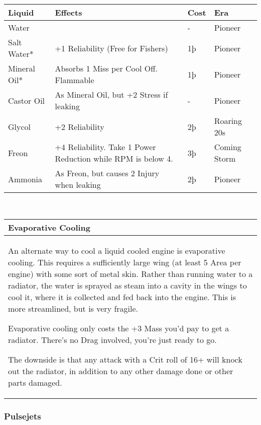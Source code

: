 \documentclass{article}
\begin{document}
\begin{tabular}{|l|l|l|l|}
    \hline
    Liquid       & Effects                                                      & Cost & Era         \\\hline
    Water        &                                                              & -    & Pioneer     \\\hline
    Salt Water*  & +1 Reliability (Free for Fishers)                            & 1þ   & Pioneer     \\\hline
    Mineral Oil* & Absorbs 1 Miss per Cool Off. Flammable                       & 1þ   & Pioneer     \\\hline
    Castor Oil   & As Mineral Oil, but +2 Stress if leaking                     & -    & Pioneer     \\\hline
    Glycol       & +2 Reliability                                               & 2þ   & Roaring 20s \\\hline
    Freon        & +4 Reliability. Take 1 Power Reduction while RPM is below 4. &
    3þ           & Coming Storm                                                                      \\\hline
    Ammonia      & As Freon, but causes 2 Injury when leaking                   & 2þ   & Pioneer     \\\hline
\end{tabular}
\\
\begin{tabular}{|l|}
    \hline
    Evaporative Cooling \\\hline

    An alternate way to cool a liquid cooled engine is evaporative cooling.
    This requires a sufficiently large wing (at least 5 Area per engine)
    with some sort of metal skin. Rather than running water to a radiator,
    the water is sprayed as steam into a cavity in the wings to cool it,
    where it is collected and fed back into the engine. This is more
    streamlined, but is very fragile.

    Evaporative cooling only costs the +3 Mass you'd pay to get a radiator.
    There's no Drag involved, you're just ready to go.

    The downside is that any attack with a Crit roll of 16+ will knock out
    the radiator, in addition to any other damage done or other parts
    damaged.            \\\hline
\end{tabular}

\subsubsection{Pulsejets}
\label{_Pulsejets}
\end{document}
